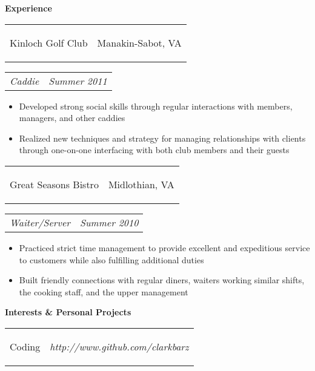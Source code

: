 \documentclass[11pt]{article}
\makeatletter
\newcommand{\headerrow}[2]
{\begin{tabular*}{\linewidth}{l@{\extracolsep{\fill}}r}
	#1 &
	#2 \\
\end{tabular*}}
\makeatother
\begin{document}
\begin{LARGE}
	\bf Experience
\end{LARGE}

\vspace{0.5em}

\headerrow
	{\begin{Large}Kinloch Golf Club\end{Large}}
	{Manakin-Sabot, VA}
\headerrow
	{\textit{Caddie}}
	{\textit{Summer 2011}}
	
\vspace{-1.0em}
\begin{itemize}
	\item Developed strong social skills through regular interactions with members, managers, and other caddies
	\vspace{-0.5em}
	\item Realized new techniques and strategy for managing relationships with clients through one-on-one interfacing with both club members and their guests 
\end{itemize}

\vspace{-0.5em}

\headerrow
	{\begin{Large}Great Seasons Bistro\end{Large}}
	{Midlothian, VA}
\headerrow
	{\textit{Waiter/Server}}
	{\textit{Summer 2010}}
	
\vspace{-1.0em}
\begin{itemize}
	\item Practiced strict time management to provide excellent and expeditious service to customers while also fulfilling additional duties
	\vspace{-0.5em}
	\item Built friendly connections with regular diners, waiters working similar shifts, the cooking staff, and the upper management
\end{itemize}

\vspace{-0.5em}

\begin{LARGE}
	\bf Interests \& Personal Projects
\end{LARGE}

\vspace{0.5em}

\headerrow
	{\begin{Large}Coding\end{Large}}
	{\textit{http://www.github.com/clarkbarz}}
	
\end{document}
